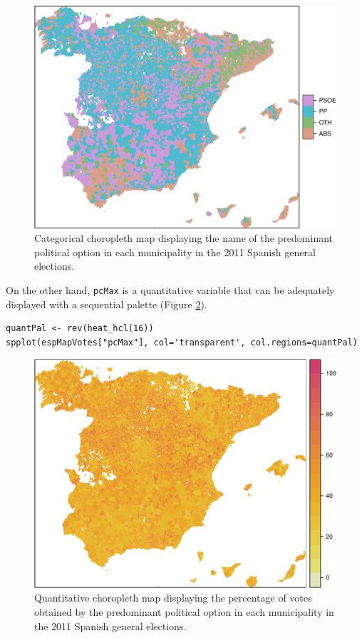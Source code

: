 \documentclass[smallroyalvopaper]{memoir}
\begin{document}
\begin{figure}[htb]
\centering
\includegraphics[width=.9\linewidth]{figs/whichMax.pdf}
\caption{\label{fig:whichMax}Categorical choropleth map displaying the name of the predominant political option in each municipality in the 2011 Spanish general elections.}
\end{figure}

On the other hand, \texttt{pcMax} is a quantitative variable that can be
adequately displayed with a sequential palette (Figure \ref{fig:pcMax}).
\lstset{language=R,numbers=none}
\begin{lstlisting}
quantPal <- rev(heat_hcl(16))
spplot(espMapVotes["pcMax"], col='transparent', col.regions=quantPal)
\end{lstlisting}

\begin{figure}[htb]
\centering
\includegraphics[width=.9\linewidth]{figs/pcMax.pdf}
\caption{\label{fig:pcMax}Quantitative choropleth map displaying the percentage of votes obtained by the predominant political option in each municipality in the 2011 Spanish general elections.}
\end{figure}
\end{document}
